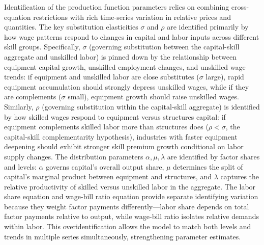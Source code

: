 \documentclass[12pt]{article}
\begin{document}
Identification of the production function parameters relies on combining cross-equation restrictions with rich time-series variation in relative prices and quantities. The key substitution elasticities $\sigma$ and $\rho$ are identified primarily by how wage patterns respond to changes in capital and labor inputs across different skill groups. Specifically, $\sigma$ (governing substitution between the capital-skill aggregate and unskilled labor) is pinned down by the relationship between equipment capital growth, unskilled employment changes, and unskilled wage trends: if equipment and unskilled labor are close substitutes ($\sigma$ large), rapid equipment accumulation should strongly depress unskilled wages, while if they are complements ($\sigma$ small), equipment growth should raise unskilled wages. Similarly, $\rho$ (governing substitution within the capital-skill aggregate) is identified by how skilled wages respond to equipment versus structures capital: if equipment complements skilled labor more than structures does ($\rho < \sigma$, the capital-skill complementarity hypothesis), industries with faster equipment deepening should exhibit stronger skill premium growth conditional on labor supply changes. The distribution parameters $\alpha, \mu, \lambda$ are identified by factor shares and levels: $\alpha$ governs capital's overall output share, $\mu$ determines the split of capital's marginal product between equipment and structures, and $\lambda$ captures the relative productivity of skilled versus unskilled labor in the aggregate. The labor share equation and wage-bill ratio equation provide separate identifying variation because they weight factor payments differently---labor share depends on total factor payments relative to output, while wage-bill ratio isolates relative demands within labor. This overidentification allows the model to match both levels and trends in multiple series simultaneously, strengthening parameter estimates.
\end{document}
